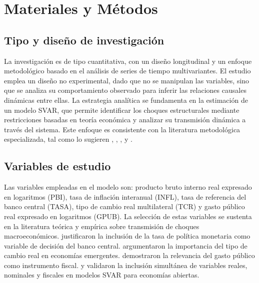 \documentclass[12pt,a4paper]{article}
\begin{document}
\section{Materiales y Métodos}

\subsection{Tipo y diseño de investigación}

La investigación es de tipo cuantitativa, con un diseño longitudinal y un enfoque metodológico basado en el análisis de series de tiempo multivariantes. El estudio emplea un diseño no experimental, dado que no se manipulan las variables, sino que se analiza su comportamiento observado para inferir las relaciones causales dinámicas entre ellas. La estrategia analítica se fundamenta en la estimación de un modelo SVAR, que permite identificar los choques estructurales mediante restricciones basadas en teoría económica y analizar su transmisión dinámica a través del sistema. Este enfoque es consistente con la literatura metodológica especializada, tal como lo sugieren \citet{sims1980}, \citet{hamilton1994}, \citet{lutkepohl2005}, \citet{enders2014} y \citet{tsay2014}.

\subsection{Variables de estudio}

Las variables empleadas en el modelo son: producto bruto interno real expresado en logaritmos (PBI), tasa de inflación interanual (INFL), tasa de referencia del banco central (TASA), tipo de cambio real multilateral (TCR) y gasto público real expresado en logaritmos (GPUB). La selección de estas variables se sustenta en la literatura teórica y empírica sobre transmisión de choques macroeconómicos. \citet{bernanke1992} justificaron la inclusión de la tasa de política monetaria como variable de decisión del banco central. \citet{kim2000} argumentaron la importancia del tipo de cambio real en economías emergentes. \citet{favero2001} demostraron la relevancia del gasto público como instrumento fiscal. \citet{blanchard2002} y \citet{perotti2004} validaron la inclusión simultánea de variables reales, nominales y fiscales en modelos SVAR para economías abiertas.
\end{document}
